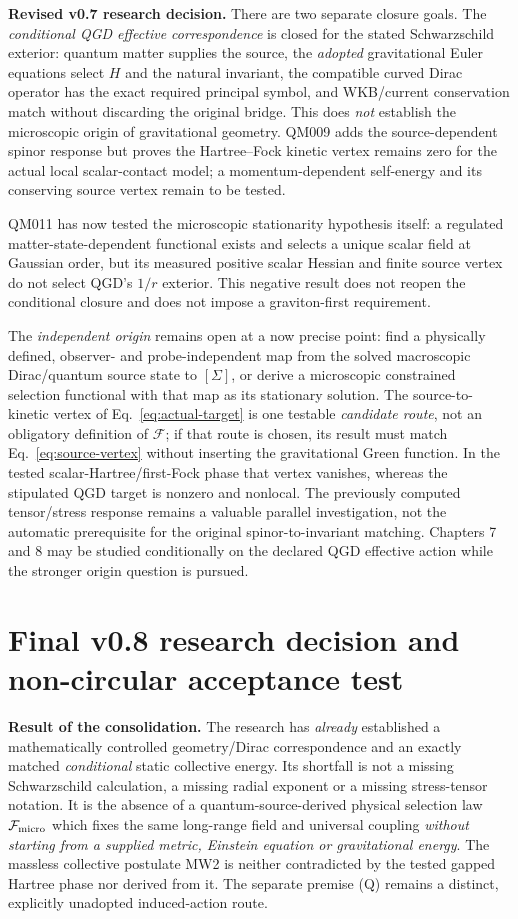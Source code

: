 \documentclass[11pt,a4paper]{article}
\begin{document}
\textbf{Revised v0.7 research decision.} There are two separate closure goals. The \emph{conditional QGD effective correspondence} is closed for the stated Schwarzschild exterior: quantum matter supplies the source, the \emph{adopted} gravitational Euler equations select $H$ and the natural invariant, the compatible curved Dirac operator has the exact required principal symbol, and WKB/current conservation match without discarding the original bridge. This does \emph{not} establish the microscopic origin of gravitational geometry. QM009 adds the source-dependent spinor response but proves the Hartree--Fock kinetic vertex remains zero for the actual local scalar-contact model; a momentum-dependent self-energy and its conserving source vertex remain to be tested.

QM011 has now tested the microscopic stationarity hypothesis itself: a regulated matter-state-dependent functional exists and selects a unique scalar field at Gaussian order, but its measured positive scalar Hessian and finite source vertex do not select QGD's $1/r$ exterior. This negative result does not reopen the conditional closure and does not impose a graviton-first requirement.\par\noindent The \emph{independent origin} remains open at a now precise point: find a physically defined, observer- and probe-independent map from the solved macroscopic Dirac/quantum source state to $[\Sigma]$, or derive a microscopic constrained selection functional with that map as its stationary solution. The source-to-kinetic vertex of Eq.~\eqref{eq:actual-target} is one testable \emph{candidate route}, not an obligatory definition of $\mathcal F$; if that route is chosen, its result must match Eq.~\eqref{eq:source-vertex} without inserting the gravitational Green function. In the tested scalar-Hartree/first-Fock phase that vertex vanishes, whereas the stipulated QGD target is nonzero and nonlocal. The previously computed tensor/stress response remains a valuable parallel investigation, not the automatic prerequisite for the original spinor-to-invariant matching. Chapters 7 and 8 may be studied conditionally on the declared QGD effective action while the stronger origin question is pursued.


\section{Final v0.8 research decision and non-circular acceptance test}\label{sec:v08-final}
\textbf{Result of the consolidation.} The research has \emph{already} established a mathematically controlled geometry/Dirac correspondence and an exactly matched \emph{conditional} static collective energy. Its shortfall is not a missing Schwarzschild calculation, a missing radial exponent or a missing stress-tensor notation. It is the absence of a quantum-source-derived physical selection law $\mathcal F_{\rm micro}$ which fixes the same long-range field and universal coupling \emph{without starting from a supplied metric, Einstein equation or gravitational energy}. The massless collective postulate MW2 is neither contradicted by the tested gapped Hartree phase nor derived from it. The separate premise (Q) remains a distinct, explicitly unadopted induced-action route.
\end{document}
